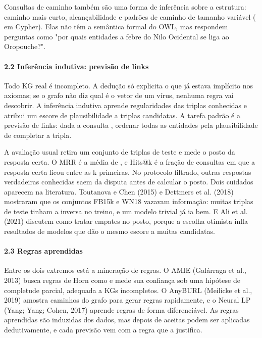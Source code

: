 \documentclass[12pt, a4paper]{article}
\DeclareRobustCommand{\texttt}[1]{\breakabletexttt{#1}}
\begin{document}
Consultas de caminho também são uma forma de inferência sobre a estrutura: caminho mais curto, alcançabilidade e padrões de caminho de tamanho variável (\texttt{{[}:PARTE\_DE*0..{]}} em Cypher). Elas não têm a semântica formal do OWL, mas respondem perguntas como "por quais entidades a febre do Nilo Ocidental se liga ao Oropouche?".

\paragraph{2.2 Inferência indutiva: previsão de links}\label{22-inferuxeancia-indutiva-previsuxe3o-de-links}

Todo KG real é incompleto. A dedução só explicita o que já estava implícito nos axiomas; se o grafo não diz qual é o vetor de um vírus, nenhuma regra vai descobrir. A inferência indutiva aprende regularidades das triplas conhecidas e atribui um escore de plausibilidade a triplas candidatas. A tarefa padrão é a previsão de links: dada a consulta \texttt{(h,\ r,\ ?)}, ordenar todas as entidades pela plausibilidade de completar a tripla.

A avaliação usual retira um conjunto de triplas de teste e mede o posto da resposta certa. O MRR é a média de \texttt{1/posto}, e Hits@k é a fração de consultas em que a resposta certa ficou entre as k primeiras. No protocolo filtrado, outras respostas verdadeiras conhecidas saem da disputa antes de calcular o posto. Dois cuidados aparecem na literatura. Toutanova e Chen (2015) e Dettmers et al. (2018) mostraram que os conjuntos FB15k e WN18 vazavam informação: muitas triplas de teste tinham a inversa no treino, e um modelo trivial já ia bem. E Ali et al. (2021) discutem como tratar empates no posto, porque a escolha otimista infla resultados de modelos que dão o mesmo escore a muitas candidatas.

\paragraph{2.3 Regras aprendidas}\label{23-regras-aprendidas}

Entre os dois extremos está a mineração de regras. O AMIE (Galárraga et al., 2013) busca regras de Horn como \texttt{casadoCom(x,\ y)\ ∧\ moraEm(y,\ z)\ ⇒\ moraEm(x,\ z)} e mede sua confiança sob uma hipótese de completude parcial, adequada a KGs incompletos. O AnyBURL (Meilicke et al., 2019) amostra caminhos do grafo para gerar regras rapidamente, e o Neural LP (Yang; Yang; Cohen, 2017) aprende regras de forma diferenciável. As regras aprendidas são induzidas dos dados, mas depois de aceitas podem ser aplicadas dedutivamente, e cada previsão vem com a regra que a justifica.
\end{document}
